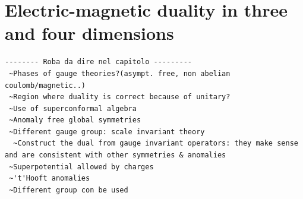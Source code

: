 \section{Electric-magnetic duality in three and four dimensions}

\begin{lstlisting}
-------- Roba da dire nel capitolo ---------
 ~Phases of gauge theories?(asympt. free, non abelian coulomb/magnetic..)
 ~Region where duality is correct because of unitary?
 ~Use of superconformal algebra
 ~Anomaly free global symmetries
 ~Different gauge group: scale invariant theory
  ~Construct the dual from gauge invariant operators: they make sense and are consistent with other symmetries & anomalies
 ~Superpotential allowed by charges
 ~'t'Hooft anomalies
 ~Different group con be used
	\end{lstlisting}


